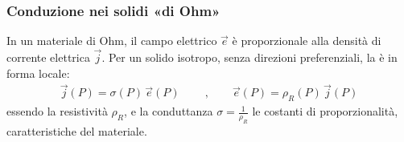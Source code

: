 \documentclass[letterpaper,10pt,italian]{jupyterBook}
\begin{document}
\subsubsection{Conduzione nei solidi «di Ohm»}
\label{\detokenize{ch/electromagnetism/electric-current:conduzione-nei-solidi-di-ohm}}
\sphinxAtStartPar
In un materiale di Ohm, il campo elettrico \(\vec{e}\) è proporzionale alla densità di corrente elettrica \(\vec{j}\). Per un solido isotropo, senza direzioni preferenziali, la  è
 in forma locale:
\begin{equation*}
\begin{split}
\vec{j}(P) = \sigma(P) \, \vec{e}(P)
\qquad \ , \qquad
\vec{e}(P) = \rho_R(P) \, \vec{j}(P)
\end{split}
\end{equation*}
\sphinxAtStartPar
essendo la resistività \(\rho_R\), e la conduttanza \(\sigma = \frac{1}{\rho_R}\) le costanti di proporzionalità, caratteristiche del materiale.
\end{document}
